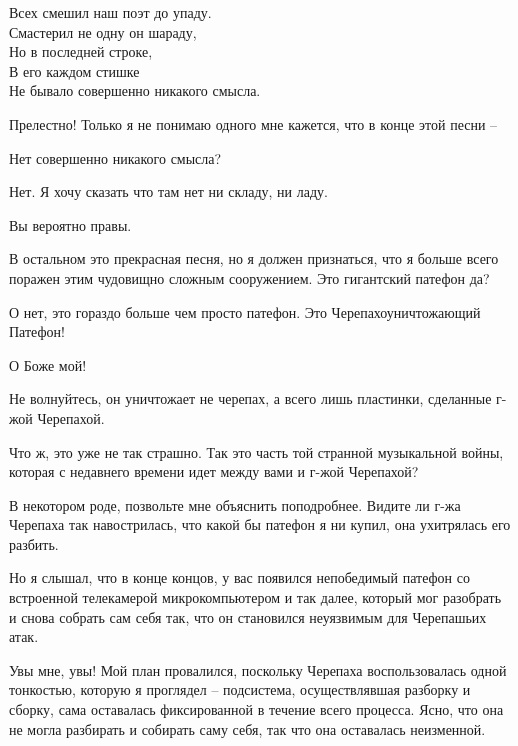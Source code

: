 \documentclass[../main.tex]{subfiles}
\begin{document}
\begin{dialogue}

\begingroup\centering
Всех смешил наш поэт до упаду. \\
Смастерил не одну он шараду, \\
Но в последней строке, \\
В его каждом стишке \\
Не бывало совершенно никакого смысла.\par
\endgroup

 Прелестно! Только я не понимаю одного мне кажется, что в конце этой песни \---

 Нет совершенно никакого смысла?

 Нет. Я хочу сказать что там нет ни складу, ни ладу.

 Вы вероятно правы.

 В остальном это прекрасная песня, но я должен признаться, что я больше всего поражен этим чудовищно сложным сооружением. Это гигантский патефон да?

 О нет, это гораздо больше чем просто патефон. Это Черепахоуничтожающий Патефон!

 О Боже мой!

 Не волнуйтесь, он уничтожает не черепах, а всего лишь пластинки, сделанные г-жой Черепахой.

 Что ж, это уже не так страшно. Так это часть той странной музыкальной войны, которая с недавнего времени идет между вами и г-жой Черепахой?

 В некотором роде, позвольте мне объяснить поподробнее. Видите ли г-жа Черепаха так навострилась, что какой бы патефон я ни купил, она ухитрялась его разбить.

 Но я слышал, что в конце концов, у вас появился непобедимый патефон со встроенной телекамерой микрокомпьютером и так далее, который мог разобрать и снова собрать сам себя так, что он становился неуязвимым для Черепашьих атак.

 Увы мне, увы! Мой план провалился, поскольку Черепаха воспользовалась одной тонкостью, которую я проглядел \--- подсистема, осуществлявшая разборку и сборку, сама оставалась фиксированной в течение всего процесса. Ясно, что она не могла разбирать и собирать саму себя, так что она оставалась неизменной.


\end{dialogue}
\end{document}
